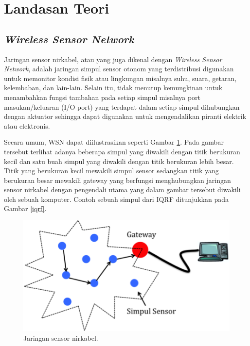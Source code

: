 \section{Landasan Teori}
  \subsection{\emph{Wireless Sensor Network}}
    Jaringan sensor nirkabel, atau yang juga dikenal dengan \emph{Wireless Sensor Network}, adalah jaringan simpul sensor otonom yang terdistribusi digunakan untuk memonitor kondisi fisik atau lingkungan misalnya suhu, suara, getaran, kelembaban, dan lain-lain. Selain itu, tidak menutup kemungkinan untuk menambahkan fungsi tambahan pada setiap simpul misalnya port masukan/keluaran (I/O port) yang terdapat dalam setiap simpul dihubungkan dengan aktuator sehingga dapat digunakan untuk mengendalikan piranti elektrik atau elektronis.

    Secara umum, WSN dapat diilustrasikan seperti Gambar \ref{wsn}. Pada gambar tersebut terlihat adanya beberapa simpul yang diwakili dengan titik berukuran kecil dan satu buah simpul yang diwakili dengan titik berukuran lebih besar. Titik yang berukuran kecil mewakili simpul sensor sedangkan titik yang berukuran besar mewakili gateway yang berfungsi menghubungkan jaringan sensor nirkabel dengan pengendali utama yang dalam gambar tersebut diwakili oleh sebuah komputer. Contoh sebuah simpul dari IQRF ditunjukkan pada Gambar \ref{iqrf}.

      \begin{figure}[H]
        \centering
          \includegraphics{gambar/wsn}
          \caption{Jaringan sensor nirkabel.}
          \label{wsn}
      \end{figure}

